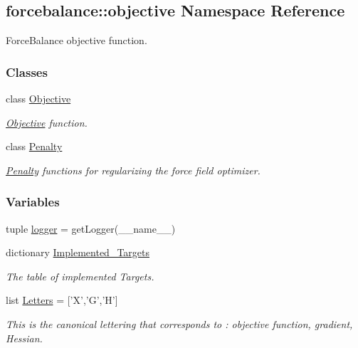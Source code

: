 \hypertarget{namespaceforcebalance_1_1objective}{\subsection{forcebalance\-:\-:objective \-Namespace \-Reference}
\label{namespaceforcebalance_1_1objective}
}


\-Force\-Balance objective function.  


\subsubsection*{\-Classes}
\begin{DoxyCompactItemize}
\item 
class \hyperlink{classforcebalance_1_1objective_1_1Objective}{\-Objective}
\begin{DoxyCompactList}\small\item\em \hyperlink{classforcebalance_1_1objective_1_1Objective}{\-Objective} function. \end{DoxyCompactList}\item 
class \hyperlink{classforcebalance_1_1objective_1_1Penalty}{\-Penalty}
\begin{DoxyCompactList}\small\item\em \hyperlink{classforcebalance_1_1objective_1_1Penalty}{\-Penalty} functions for regularizing the force field optimizer. \end{DoxyCompactList}\end{DoxyCompactItemize}
\subsubsection*{\-Variables}
\begin{DoxyCompactItemize}
\item 
tuple \hyperlink{namespaceforcebalance_1_1objective_afa1d976cc1f8b18cf0b03f1ccf49f590}{logger} = get\-Logger(\-\_\-\-\_\-name\-\_\-\-\_\-)
\item 
dictionary \hyperlink{namespaceforcebalance_1_1objective_aad3b66466fd22980d2c83c67b82ddddf}{\-Implemented\-\_\-\-Targets}
\begin{DoxyCompactList}\small\item\em \-The table of implemented \-Targets. \end{DoxyCompactList}\item 
list \hyperlink{namespaceforcebalance_1_1objective_a01660ebc02853011e66350c410e26f0a}{\-Letters} = \mbox{[}'\-X','\-G','\-H'\mbox{]}
\begin{DoxyCompactList}\small\item\em \-This is the canonical lettering that corresponds to \-: objective function, gradient, \-Hessian. \end{DoxyCompactList}\end{DoxyCompactItemize}


